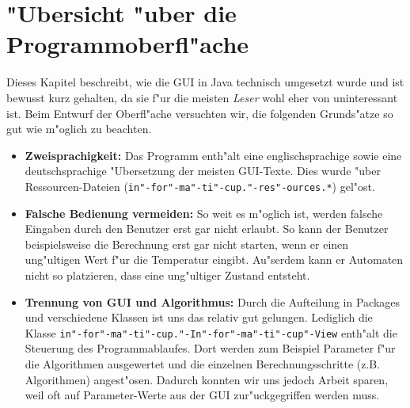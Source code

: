 \section{"Ubersicht "uber die Programmoberfl"ache}
Dieses Kapitel beschreibt, wie die GUI in Java technisch umgesetzt wurde und ist bewusst kurz gehalten, da sie f"ur die meisten \emph{Leser} wohl eher von uninteressant ist. Beim Entwurf der Oberfl"ache versuchten wir, die folgenden Grunds"atze so gut wie m"oglich zu beachten.
\begin{itemize}
\item \textbf{Zweisprachigkeit:} Das Programm enth"alt eine englischsprachige sowie eine deutschsprachige "Ubersetzung der meisten GUI-Texte. Dies wurde "uber Ressourcen-Dateien (\texttt{in"-for"-ma"-ti"-cup."-res"-ources.*}) gel"ost. 
\item \textbf{Falsche Bedienung vermeiden:} So weit es m"oglich ist, werden falsche Eingaben durch den Benutzer erst gar nicht erlaubt. So kann der Benutzer beispielsweise die Berechnung erst gar nicht starten, wenn er einen ung"ultigen Wert f"ur die Temperatur eingibt. Au"serdem kann er Automaten nicht so platzieren, dass eine ung"ultiger Zustand entsteht.
\item \textbf{Trennung von GUI und Algorithmus:} Durch die Aufteilung in Packages und verschiedene Klassen ist uns das relativ gut gelungen. Lediglich die Klasse \texttt{in"-for"-ma"-ti"-cup."-In"-for"-ma"-ti"-cup"-View} enth"alt die Steuerung des Programmablaufes. Dort werden zum Beispiel Parameter f"ur die Algorithmen ausgewertet und die einzelnen Berechnungsschritte (z.B. Algorithmen) angest"osen. Dadurch konnten wir uns jedoch Arbeit sparen, weil oft auf Parameter-Werte aus der GUI zur"uckgegriffen werden muss.
\end{itemize}



